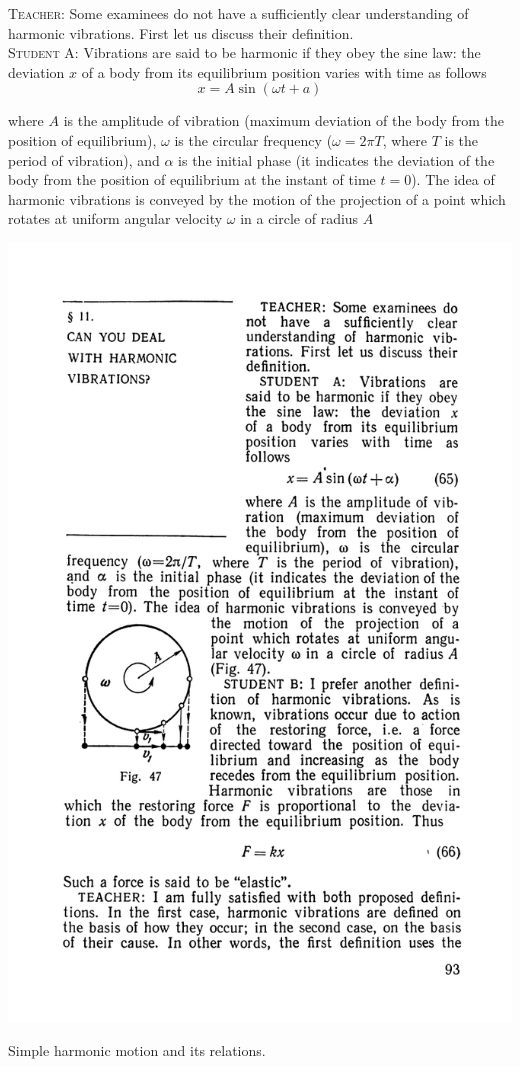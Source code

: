\documentclass[a4paper,sfsidenotes]{tufte-book}
\begin{document}
\textsc{Teacher:} Some examinees do not have a sufficiently clear
understanding of harmonic vibrations. First let us discuss their definition.
\\
\textsc{Student A:} Vibrations are said to be harmonic if they obey the sine law: the deviation $x$ of a body from its equilibrium position varies with time as follows
\begin{equation}
x= A \sin ( \omega t + a)
\label{eq-65}
\end{equation}

where $A$ is the amplitude of vibration (maximum deviation of the body from the position of
equilibrium), $\omega$ is the circular frequency ($\omega = 2 \pi T$, where $T$ is the period of vibration), and $\alpha$ is the initial phase (it indicates the deviation of the body from the position of equilibrium at the instant of time $t=0$). The idea of harmonic vibrations is conveyed by the motion of the projection of a point which rotates at uniform angular velocity $\omega$ in a circle of radius $A$
\\
\begin{marginfigure}
\centering
\includegraphics[width=0.8\linewidth]{fig-047a.pdf}
\caption{Simple harmonic motion and its relations.}
\label{fig-47}
\end{marginfigure}
\end{document}
